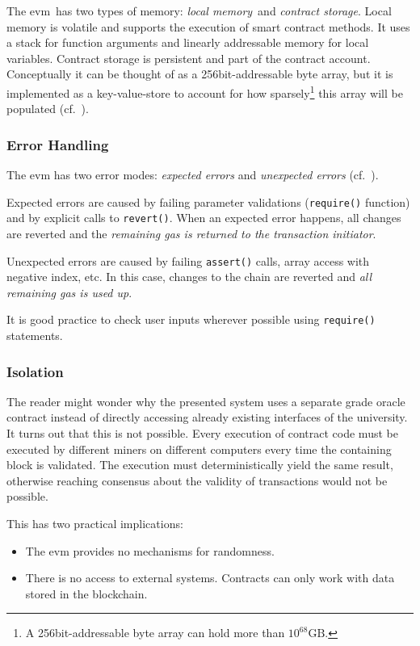 The \ac{evm} has two types of memory: \emph{local memory} and \emph{contract storage}.
Local memory is volatile and supports the execution of smart contract methods. It uses
a stack for function arguments and linearly addressable memory for local variables.
Contract storage is persistent and part of the contract account. Conceptually
it can be thought of as a 256bit-addressable byte array, but it is implemented as a key-value-store
to account for how sparsely\footnote{A 256bit-addressable byte array can hold more than $10^{68}\mathrm{GB}$.}
this array will be populated (cf.\ \cite{Marx18}).

\subsubsection{Error Handling}

The \ac{evm} has two error modes: \emph{expected errors} and \emph{unexpected errors} (cf.\ \cite{Maurelian17}).

Expected errors are caused by failing parameter validations (\texttt{require()} function) and by explicit calls to \texttt{revert()}.
When an expected error happens, all changes are
reverted and the {\em remaining gas is returned to the transaction initiator}.

Unexpected errors are caused by failing \texttt{assert()} calls, array access with negative
index, etc.
In this case, changes to the chain are reverted and {\em all remaining gas is used up}.

It is good practice to check user inputs wherever possible using \texttt{require()} statements. 

\subsubsection{Isolation}
\label{sec:dev:isolation}

The reader might wonder why the presented system uses a separate grade oracle contract
instead of directly accessing already existing interfaces of the university.
It turns out that this is not possible.
Every execution of contract code must be executed by different miners on different
computers every time the containing block is validated.
The execution must deterministically yield the same result,
otherwise reaching consensus about the validity of transactions would not be possible.

This has two practical implications:

\begin{itemize}
    \item The \ac{evm} provides no mechanisms for randomness.
    \item There is no access to external systems. Contracts can only work with data stored in the blockchain.
\end{itemize}


